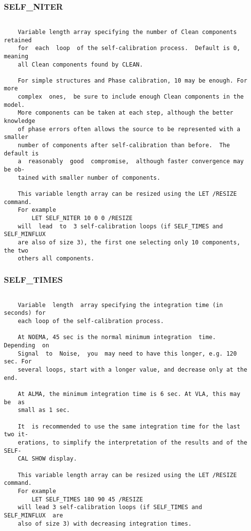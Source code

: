 \subsubsection{SELF\_NITER}
\begin{verbatim}

    Variable length array specifying the number of Clean components retained
    for  each  loop  of the self-calibration process.  Default is 0, meaning
    all Clean components found by CLEAN.

    For simple structures and Phase calibration, 10 may be enough. For  more
    complex  ones,  be sure to include enough Clean components in the model.
    More components can be taken at each step, although the better knowledge
    of phase errors often allows the source to be represented with a smaller
    number of components after self-calibration than before.  The default is
    a  reasonably  good  compromise,  although faster convergence may be ob-
    tained with smaller number of components.

    This variable length array can be resized using the LET /RESIZE command.
    For example
        LET SELF_NITER 10 0 0 /RESIZE
    will  lead  to  3 self-calibration loops (if SELF_TIMES and SELF_MINFLUX
    are also of size 3), the first one selecting only 10 components, the two
    others all components.

\end{verbatim}
\subsubsection{SELF\_TIMES}
\begin{verbatim}

    Variable  length  array specifying the integration time (in seconds) for
    each loop of the self-calibration process.

    At NOEMA, 45 sec is the normal minimum integration  time.  Depending  on
    Signal  to  Noise,  you  may need to have this longer, e.g. 120 sec. For
    several loops, start with a longer value, and decrease only at the end.

    At ALMA, the minimum integration time is 6 sec. At VLA, this may  be  as
    small as 1 sec.

    It  is recommended to use the same integration time for the last two it-
    erations, to simplify the interpretation of the results and of the SELF-
    CAL SHOW display.

    This variable length array can be resized using the LET /RESIZE command.
    For example
        LET SELF_TIMES 180 90 45 /RESIZE
    will lead 3 self-calibration loops (if SELF_TIMES and  SELF_MINFLUX  are
    also of size 3) with decreasing integration times.

\end{verbatim}
